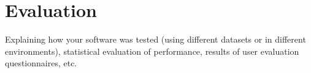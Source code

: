\chapter{Evaluation}

Explaining how your software was tested (using different datasets or in different environments), statistical evaluation of performance, results of user evaluation questionnaires, etc.
